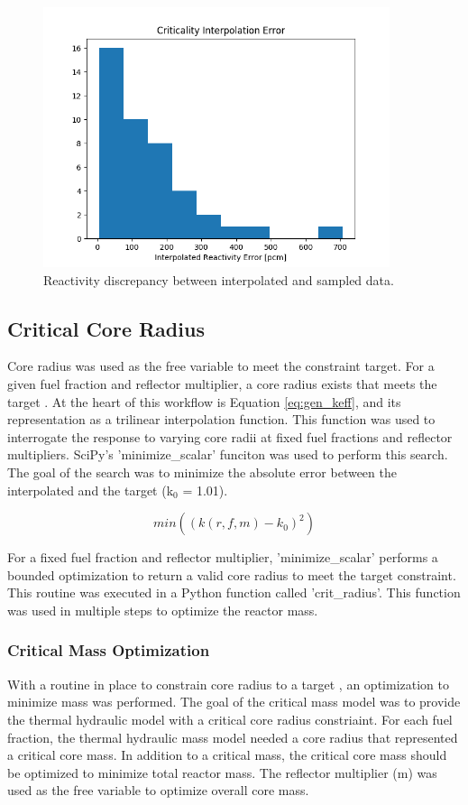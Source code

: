 \begin{figure}[h]
    \centering
    \includegraphics[width=4in]{../images/check_interp.png}
\caption{Reactivity discrepancy between interpolated and sampled data.}
\label{fig:interp_check}
\end{figure}

\subsection{Critical Core Radius}
Core radius was used as the free variable to meet the \keff constraint target. For
a given fuel fraction and reflector multiplier, a core radius exists that meets
the target \keff. At the heart of this workflow is Equation \ref{eq:gen_keff},
and its representation as a trilinear interpolation function. This function was
used to interrogate the \keff response to varying core radii at fixed fuel
fractions and reflector multipliers. SciPy's 'minimize\_scalar' funciton was used to
perform this search. The goal of the search was to minimize the absolute error
between the interpolated \keff and the target \keff (k$_0$ = 1.01).

\begin{equation}
    min( (k(r, f, m) - k_0)^2 )
    \label{eq:crit_rad}
\end{equation}

For a fixed fuel fraction and reflector multiplier, 'minimize\_scalar' performs a
bounded optimization to return a valid core radius to meet the target \keff
constraint. This routine was executed in a Python function called 'crit\_radius'.
This function was used in multiple steps to optimize the reactor mass.

\subsubsection{Critical Mass Optimization}
With a routine in place to constrain core radius to a target \keff, an
optimization to minimize mass was performed. The goal of the critical mass model
was to provide the thermal hydraulic model with a critical core radius
constriaint. For each
fuel fraction, the thermal hydraulic mass model needed a core radius that
represented a critical core mass. In addition to a critical mass, the critical
core mass should be optimized to minimize total reactor mass. 
The reflector multiplier (m) was used as the free variable to optimize overall core mass. 

